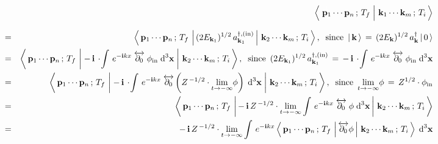 \begin{eqnarray*}
&&
    \underset{{\color{white}1}}{
	    \left\langle\,
	        \left.
	        \overset{{\color{white}1}}{\mathbf{p}_{1}} \cdots \mathbf{p}_{n}\,;\,T_{f}
	        \;\right\vert\,
	        \mathbf{k}_{1} \cdots \mathbf{k}_{m}\,;\,T_{i}
	        \,\right\rangle
        }
\\
& = &
    \left\langle\,
        \mathbf{p}_{1} \cdots \mathbf{p}_{n}\,;\,T_{f}
        \,\left\vert\,
        (2 E_{\mathbf{k}_{1}})^{1/2}\,a^{\dagger,(\textnormal{in})}_{\mathbf{k}_{1}}
        \,\right\vert\,
        \mathbf{k}_{2} \cdots \mathbf{k}_{m}\,;\,T_{i}
        \,\right\rangle,
    \;\;
    \textnormal{since \,$\left\vert\,\mathbf{k}\,\right\rangle \,=\, (2 E_{\mathbf{k}})^{1/2}\,a^{\dagger}_{\mathbf{k}}\left\vert\,0\,\right\rangle$}
\\
& = &
    \left\langle\,
        \mathbf{p}_{1} \cdots \mathbf{p}_{n}\,;\,T_{f}
        \,\left\vert\;
        -\,\i\,\cdot\!\int\,
            e^{-\i k x}\;\overleftrightarrow{\partial_{0}}\;\phi_{\textnormal{in}}
            \;\d^{3}\mathbf{x}
        \;\right\vert\,
        \mathbf{k}_{2} \cdots \mathbf{k}_{m}\,;\,T_{i}
        \,\right\rangle,
    \;\;
    \textnormal{since \,$
        (2 E_{\mathbf{k}_{1}})^{1/2}\,a^{\dagger,(\textnormal{in})}_{\mathbf{k}_{1}}
        \, = \,
	        -\,\i\,\cdot\!\int\,
	            e^{-\i k x}\;\overleftrightarrow{\partial_{0}}\;\phi_{\textnormal{in}}
	            \;\d^{3}\mathbf{x}
	    $}
\\
& = &
    \left\langle\,
        \mathbf{p}_{1} \cdots \mathbf{p}_{n}\,;\,T_{f}
        \,\left\vert\;
        -\,\i\,\cdot\!\int\,
            e^{-\i k x}\;\overleftrightarrow{\partial_{0}}
            \left(Z^{\,-1/2}\cdot\underset{t\rightarrow-\infty}{\lim}\phi\right)
            \;\d^{3}\mathbf{x}
        \;\right\vert\,
        \mathbf{k}_{2} \cdots \mathbf{k}_{m}\,;\,T_{i}
        \,\right\rangle,
    \;\;
    \textnormal{since \,$\underset{t\rightarrow-\infty}{\lim}\phi \,=\, Z^{1/2}\cdot\phi_{\textnormal{in}}$}
\\
& = &
    \left\langle\,
        \mathbf{p}_{1} \cdots \mathbf{p}_{n}\,;\,T_{f}
        \,\left\vert\,
        -\,\i\,Z^{\,-1/2}\cdot\underset{t\rightarrow-\infty}{\lim}\int\,
            e^{-\i k x}\;\overleftrightarrow{\partial_{0}}\;\phi
            \;\d^{3}\mathbf{x}
        \,\right\vert\,
        \mathbf{k}_{2} \cdots \mathbf{k}_{m}\,;\,T_{i}
        \,\right\rangle
\\
& = &
    -\,\i\,Z^{\,-1/2}\cdot\underset{t\rightarrow-\infty}{\lim}\int\,
    e^{-\i k x}
    \left\langle\,
        \mathbf{p}_{1} \cdots \mathbf{p}_{n}\,;\,T_{f}
        \,\left\vert\,
            \overleftrightarrow{\partial_{0}}\phi
        \,\right\vert\,
        \mathbf{k}_{2} \cdots \mathbf{k}_{m}\,;\,T_{i}
        \,\right\rangle
        \;\d^{3}\mathbf{x}
\end{eqnarray*}

